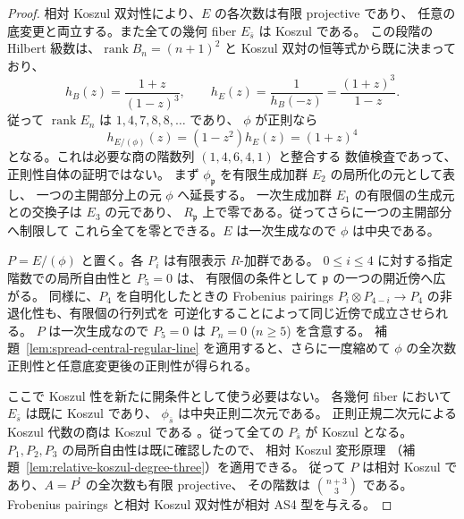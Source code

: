 \begin{proof}
相対 Koszul 双対性により、$E$ の各次数は有限 projective であり、
任意の底変更と両立する。また全ての幾何 fiber $E_{\bar s}$ は Koszul である。
この段階の Hilbert 級数は、$\operatorname{rank}B_n=(n+1)^2$ と
Koszul 双対の恒等式から既に決まっており、
\[
 h_B(z)=\frac{1+z}{(1-z)^3},\qquad
 h_E(z)=\frac1{h_B(-z)}=\frac{(1+z)^3}{1-z}.
 \tag{AS4-ranks}\label{eq:noncubic-spread-as4-hilbert}
\]
従って $\operatorname{rank}E_n$ は
$1,4,7,8,8,\ldots$ であり、
$\phi$ が正則なら
\[
 h_{E/(\phi)}(z)=(1-z^2)h_E(z)=(1+z)^4
\]
となる。これは必要な商の階数列 $(1,4,6,4,1)$ と整合する
数値検査であって、正則性自体の証明ではない。
まず $\phi_{\mathfrak p}$ を有限生成加群 $E_2$ の局所化の元として表し、
一つの主開部分上の元 $\phi$ へ延長する。
一次生成加群 $E_1$ の有限個の生成元との交換子は $E_3$ の元であり、
$R_{\mathfrak p}$ 上で零である。従ってさらに一つの主開部分へ制限して
これら全てを零とできる。$E$ は一次生成なので $\phi$ は中央である。

$P=E/(\phi)$ と置く。各 $P_i$ は有限表示 $R$-加群である。
$0\leq i\leq4$ に対する指定階数での局所自由性と $P_5=0$ は、
有限個の条件として $\mathfrak p$ の一つの開近傍へ広がる。
同様に、$P_4$ を自明化したときの Frobenius pairings
$P_i\otimes P_{4-i}\to P_4$ の非退化性も、有限個の行列式を
可逆化することによって同じ近傍で成立させられる。
$P$ は一次生成なので $P_5=0$ は $P_n=0$ ($n\geq5$) を含意する。
補題~\ref{lem:spread-central-regular-line} を適用すると、さらに一度縮めて
$\phi$ の全次数正則性と任意底変更後の正則性が得られる。

ここで Koszul 性を新たに開条件として使う必要はない。
各幾何 fiber において $E_{\bar s}$ は既に Koszul であり、
$\phi_{\bar s}$ は中央正則二次元である。
正則正規二次元による Koszul 代数の商は Koszul である
\cite{SheltonTingey2001}。従って全ての $P_{\bar s}$ が Koszul となる。
$P_1,P_2,P_3$ の局所自由性は既に確認したので、
相対 Koszul 変形原理
（補題~\ref{lem:relative-koszul-degree-three}）を適用できる。
従って $P$ は相対 Koszul であり、$A=P^!$ の全次数も有限 projective、
その階数は $\binom{n+3}{3}$ である。
Frobenius pairings と相対 Koszul 双対性が相対 AS4 型を与える。


\end{proof}
